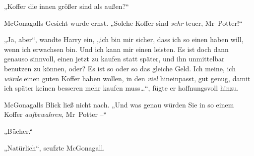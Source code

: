 „Koffer die innen größer sind als außen?“

McGonagalls Gesicht wurde ernst. „Solche Koffer sind \emph{sehr} teuer, Mr~Potter!“

„Ja, aber“, wandte Harry ein, „ich bin mir sicher, dass ich so einen haben will, wenn ich erwachsen bin. Und ich kann mir einen leisten. Es ist doch dann genauso sinnvoll, einen jetzt zu kaufen statt später, und ihn unmittelbar benutzen zu können, oder? Es ist so oder so das gleiche Geld. Ich meine, ich \emph{würde} einen guten Koffer haben wollen, in den \emph{viel} hineinpasst, gut genug, damit ich später keinen besseren mehr kaufen muss…“, fügte er hoffnungsvoll hinzu.

McGonagalls Blick ließ nicht nach. „Und was genau würden Sie in so einem Koffer \emph{aufbewahren}, Mr~Potter –“

„Bücher.“

„Natürlich“, seufzte McGonagall.

